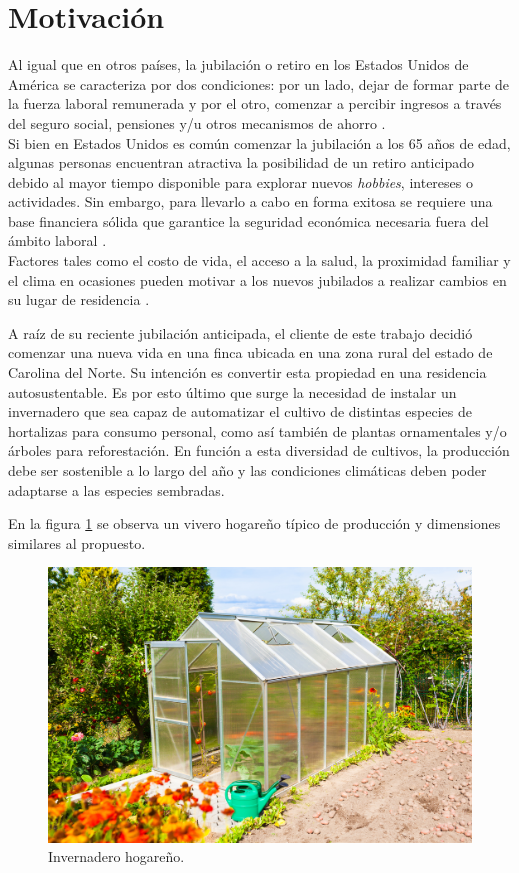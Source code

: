 \section{Motivación}
\label{Motivación}

Al igual que en otros países, la jubilación o retiro en los Estados Unidos de América se caracteriza por dos condiciones: por un lado, dejar de formar parte de la fuerza laboral remunerada y por el otro, comenzar a percibir ingresos a través del seguro social, pensiones y/u otros mecanismos de ahorro \citep{csreports:1}. \\
Si bien en Estados Unidos es común comenzar la jubilación a los 65 años de edad, algunas personas encuentran atractiva la posibilidad de un retiro anticipado debido al mayor tiempo disponible para explorar nuevos \textit{hobbies}, intereses o actividades. Sin embargo, para llevarlo a cabo en forma exitosa se requiere una base financiera sólida que garantice la seguridad económica necesaria fuera del ámbito laboral \citep{yahoo:1}. \\
Factores tales como el costo de vida, el acceso a la salud, la proximidad familiar y el clima en ocasiones pueden motivar a los nuevos jubilados a realizar cambios en su lugar de residencia  \citep{RelocatingAfterRetiring} \citep{Kim2021}. 

A raíz de su reciente jubilación anticipada, el cliente de este trabajo decidió comenzar una nueva vida en una finca ubicada en una zona rural del estado de Carolina del Norte. Su intención es convertir esta propiedad en una residencia autosustentable. Es por esto último que surge la necesidad de instalar un invernadero que sea capaz de automatizar el cultivo de distintas especies de hortalizas para consumo personal, como así también de plantas ornamentales y/o  árboles para reforestación. En función a esta diversidad de cultivos, la producción debe ser sostenible a lo largo del año y las condiciones climáticas deben poder adaptarse a las especies sembradas. 




 
En la figura \ref{fig:imgInvernadero} se observa un vivero hogareño típico de producción y dimensiones similares al propuesto.




\begin{figure}[htpb]
\centering 
\includegraphics[width=.7\textwidth]{../Figures/invernadero1.jpg}
\caption{Invernadero hogareño\protect\footnotemark.}
\label{fig:imgInvernadero}
\end{figure}


